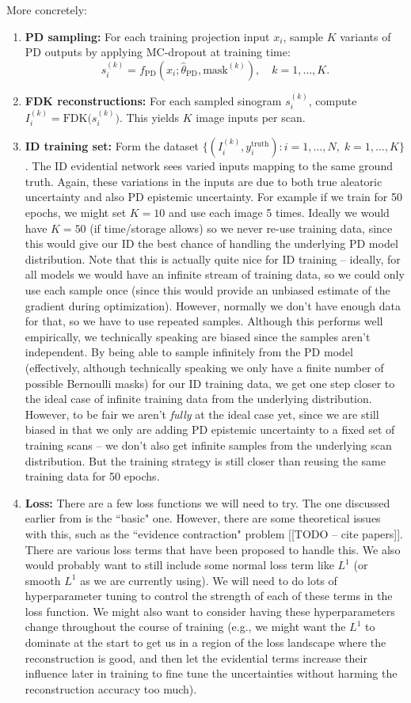 \documentclass{article}
\newcommand{\0}{\varnothing}
\theoremstyle{definition}
\begin{document}
More concretely:
\begin{enumerate}[1.]
  \item \textbf{PD sampling:} For each training projection input $x_i$, sample $K$ variants of PD outputs by applying MC-dropout at training time: 
    \[
      s_i^{(k)} = f_\text{PD}(x_i; \hat\theta_\text{PD}, \text{mask}^{(k)}), \quad k=1,\dots,K.
    \]
  \item \textbf{FDK reconstructions:} For each sampled sinogram $s_i^{(k)}$, compute $I_i^{(k)} = \mathrm{FDK}\bigl(s_i^{(k)}\bigr)$. This yields $K$ image inputs per scan.
  \item \textbf{ID training set:} Form the dataset $\{(I_i^{(k)}, y_i^\text{truth}) : i=1,\dots,N,\;k=1,\dots,K\}$. The ID evidential network sees varied inputs mapping to the same ground truth. Again, these variations in the inputs are due to both true aleatoric uncertainty and also PD epistemic uncertainty. For example if we train for 50 epochs, we might set $K=10$ and use each image 5 times. Ideally we would have $K=50$ (if time/storage allows) so we never re-use training data, since this would give our ID the best chance of handling the underlying PD model distribution. Note that this is actually quite nice for ID training -- ideally, for all models we would have an infinite stream of training data, so we could only use each sample once (since this would provide an unbiased estimate of the gradient during optimization). However, normally we don't have enough data for that, so we have to use repeated samples. Although this performs well empirically, we technically speaking are biased since the samples aren't independent. By being able to sample infinitely from the PD model (effectively, although technically speaking we only have a finite number of possible Bernoulli masks) for our ID training data, we get one step closer to the ideal case of infinite training data from the underlying distribution. However, to be fair we aren't \textit{fully} at the ideal case yet, since we are still biased in that we only are adding PD epistemic uncertainty to a fixed set of training scans -- we don't also get infinite samples from the underlying scan distribution.  But the training strategy is still closer than reusing the same training data for 50 epochs.
  \item \textbf{Loss:}
There are a few loss functions we will need to try. The one discussed earlier from \cite{amini2020deep} is the ``basic" one. However, there are some theoretical issues with this, such as the ``evidence contraction" problem [[TODO -- cite papers]]. There are various loss terms that have been proposed to handle this. We also would probably want to still include some normal loss term like $L^1$ (or smooth $L^1$ as we are currently using). We will need to do lots of hyperparameter tuning to control the strength of each of these terms in the loss function. We might also want to consider  having these hyperparameters change throughout the course of training (e.g., we might want the $L^1$ to dominate at the start to get us in a region of the loss landscape where the reconstruction is good, and then let the evidential terms increase their influence later in training to fine tune the uncertainties without harming the reconstruction accuracy too much).

\end{enumerate}
\end{document}
